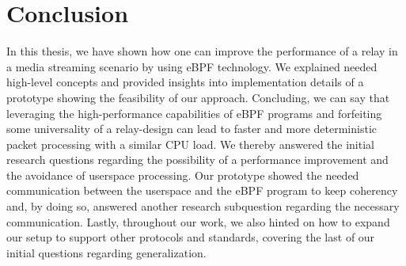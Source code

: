 \section{Conclusion}\label{sec:conclusion}
In this thesis, we have shown how one can improve the performance of a relay in a media streaming scenario 
by using eBPF technology.
We explained needed high-level concepts and provided insights into implementation details of a prototype 
showing the feasibility of our approach.
Concluding, we can say that leveraging the high-performance capabilities of eBPF programs and forfeiting 
some universality of a relay-design can lead to faster and more deterministic packet processing with 
a similar CPU load.
We thereby answered the initial research questions regarding the possibility of a performance improvement 
and the avoidance of userspace processing.
Our prototype showed the needed communication between the userspace and the eBPF program to keep coherency and, by doing so, answered another research subquestion regarding the necessary communication.
Lastly, throughout our work, we also hinted on how to expand our setup to support other protocols and standards, 
covering the last of our initial questions regarding generalization.
